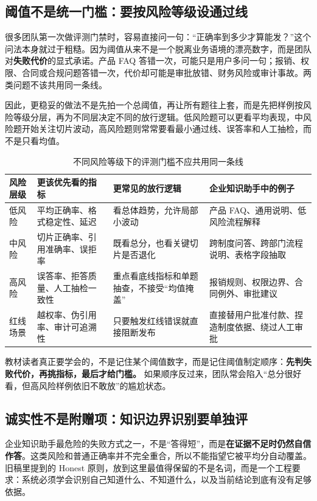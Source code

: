 \subsection{阈值不是统一门槛：要按风险等级设通过线}
很多团队第一次做评测门禁时，容易直接问一句：“正确率到多少才算能发？”这个问法本身就过于粗糙。因为阈值从来不是一个脱离业务语境的漂亮数字，而是团队对\textbf{失败代价}的显式承诺。产品 FAQ 答错一次，可能只是用户多问一句；报销、权限、合同或合规问题答错一次，代价却可能是审批放错、财务风险或审计事故。两类问题不该共用同一条线。

因此，更稳妥的做法不是先拍一个总阈值，再让所有题往上套，而是先把样例按风险等级分层，再为不同层决定不同的放行逻辑。低风险题可以更看平均表现，中风险题开始关注切片波动，高风险题则常常要看最小通过线、误答率和人工抽检，而不是只看均值。

\begin{table}[H]
\centering
\small
\begin{tabularx}{\textwidth}{>{\raggedright\arraybackslash}p{2.4cm}>{\raggedright\arraybackslash}p{3.1cm}>{\raggedright\arraybackslash}p{3cm}>{\raggedright\arraybackslash}X}
\toprule
\textbf{风险层级} & \textbf{更该优先看的指标} & \textbf{更常见的放行逻辑} & \textbf{企业知识助手中的例子} \\
\midrule
低风险 & 平均正确率、格式稳定性、延迟 & 看总体趋势，允许局部小波动 & 产品 FAQ、通用说明、低风险流程解释 \\
中风险 & 切片正确率、引用准确率、误拒率 & 既看总分，也看关键切片是否退化 & 跨制度问答、跨部门流程说明、表格字段抽取 \\
高风险 & 误答率、拒答质量、人工抽检一致性 & 重点看底线指标和单题抽查，不接受“均值掩盖” & 报销规则、权限边界、合同例外、审批建议 \\
红线场景 & 越权率、伪引用率、审计可追溯性 & 只要触发红线错误就直接阻断发布 & 直接替用户批准付款、捏造制度依据、绕过人工审批 \\
\bottomrule
\end{tabularx}
\caption{不同风险等级下的评测门槛不应共用同一条线}
\label{tab:eval-risk-thresholds}
\end{table}

教材读者真正要学会的，不是记住某个阈值数字，而是记住阈值制定顺序：\textbf{先判失败代价，再挑指标，最后才给门槛。} 如果顺序反过来，团队常会陷入“总分很好看，但高风险样例依旧不敢放”的尴尬状态。

\subsection{诚实性不是附赠项：知识边界识别要单独评}
企业知识助手最危险的失败方式之一，不是“答得短”，而是\textbf{在证据不足时仍然自信作答}。这类风险和普通正确率并不完全重合，所以不能指望它被平均分自动覆盖。旧稿里提到的 Honest 原则，放到这里最值得保留的不是名词，而是一个工程要求：系统必须学会识别自己知道什么、不知道什么，以及当前结论到底有没有足够依据。

